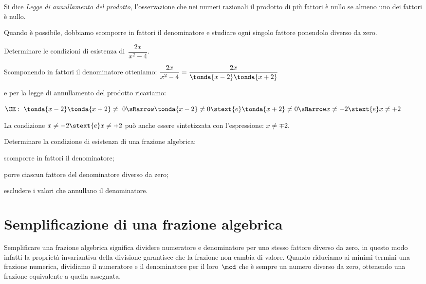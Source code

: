 \begin{definizione}
Si dice \emph{Legge di annullamento del prodotto}, l'osservazione che nei 
numeri razionali il prodotto di più fattori è nullo se almeno uno dei fattori 
è nullo.
\end{definizione}

Quando è possibile, dobbiamo scomporre in fattori il denominatore e studiare 
ogni singolo fattore ponendolo diverso da zero.

 \begin{esempio}
Determinare le condizioni di esistenza di~\(\dfrac{2x}{x^{2}-4}\).

Scomponendo in fattori il denominatore otteniamo:
\(\dfrac{2x}{x^{2}-4} = \dfrac{2x}{\tonda{x-2}\tonda{x+2}}\)

e per la legge di annullamento del prodotto ricaviamo:

\(\CE:~ \tonda{x-2}\tonda{x+2} \neq~0 \sRarrow 
\tonda{x-2} \neq 0 \stext{e} \tonda{x+2} \neq 0 \sRarrow 
x \neq -2 \stext{e} x \neq +2\)

La condizione \(x \neq -2 \stext{e} x \neq +2\) può anche essere sintetizzata 
con l'espressione: \(x \neq \mp 2\).
 \end{esempio}

\begin{procedura}
Determinare la condizione di esistenza di una frazione algebrica:
\begin{enumeratea}
\item scomporre in fattori il denominatore;
\item porre ciascun fattore del denominatore diverso da zero;
\item escludere i valori che annullano il denominatore.
\end{enumeratea}
\end{procedura}


\section{Semplificazione di una frazione algebrica}
\label{sec:frazalg_semplificazione}

Semplificare una frazione algebrica significa dividere numeratore e 
denominatore per uno stesso fattore diverso da zero, in questo modo infatti 
la proprietà invariantiva della divisione garantisce che la frazione non 
cambia di valore.
Quando riduciamo ai minimi termini una frazione numerica, dividiamo il 
numeratore e il denominatore per il loro~\(\mcd\) che è sempre un numero
diverso da zero, ottenendo una frazione equivalente a quella assegnata.

